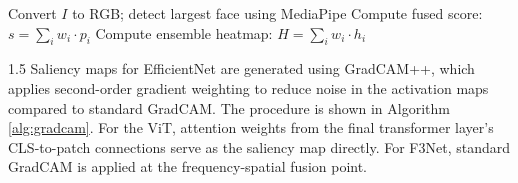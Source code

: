 \begin{algorithm}[H]
\SetAlgoLined
{}

Convert $I$ to RGB; detect largest face using MediaPipe\;
Compute fused score: $s = \sum_i w_i \cdot p_i$\;
Compute ensemble heatmap: $H = \sum_i w_i \cdot h_i$\;
\caption{Multi-Model Deepfake Detection and Fusion}
\label{alg:fusion}
\end{algorithm}

\begin{spacing}{1.5}
Saliency maps for EfficientNet are generated using GradCAM++, which applies second-order gradient weighting to reduce noise in the activation maps compared to standard GradCAM. The procedure is shown in Algorithm \ref{alg:gradcam}. For the ViT, attention weights from the final transformer layer's CLS-to-patch connections serve as the saliency map directly. For F3Net, standard GradCAM is applied at the frequency-spatial fusion point.
\end{spacing}

